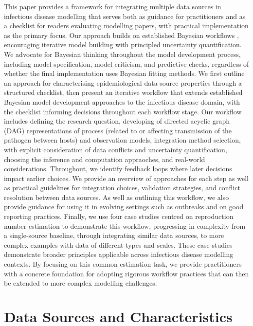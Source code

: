 \documentclass{article}
\begin{document}
This paper provides a framework for integrating multiple data sources in infectious disease modelling that serves both as guidance for practitioners and as a checklist for readers evaluating modelling papers, with practical implementation as the primary focus. 
Our approach builds on established Bayesian workflows \citep{gelman2020bayesian}, encouraging iterative model building with principled uncertainty quantification. We advocate for Bayesian thinking throughout the model development process, including model specification, model criticism, and predictive checks, regardless of whether the final implementation uses Bayesian fitting methods. 
We first outline an approach for characterising epidemiological data source properties through a structured checklist, then present an iterative workflow that extends established Bayesian model development approaches to the infectious disease domain, with the checklist informing decisions throughout each workflow stage. 
Our workflow includes defining the research question, developing of directed acyclic graph (DAG) representations of process (related to or affecting transmission of the pathogen between hosts) and observation models, integration method selection, with explicit consideration of data conflicts and uncertainty quantification, choosing the inference and computation appraoches, and real-world considerations. Throughout, we identify feedback loops where later decisions impact earlier choices. 
We provide an overview of approaches for each step as well as practical guidelines for integration choices, validation strategies, and conflict resolution between data sources. 
As well as outlining this workflow, we also provide guidance for using it in evolving settings such as outbreaks and on good reporting practices.
Finally, we use four case studies centred on reproduction number estimation to demonstrate this workflow, progressing in complexity from a single-source baseline, through integrating similar data sources, to more complex examples with data of different types and scales. 
These case studies demonstrate broader principles applicable across infectious disease modelling contexts. 
By focusing on this common estimation task, we provide practitioners with a concrete foundation for adopting rigorous workflow practices that can then be extended to more complex modelling challenges.

\section{Data Sources and Characteristics} \label{sec:datareview}
\end{document}
